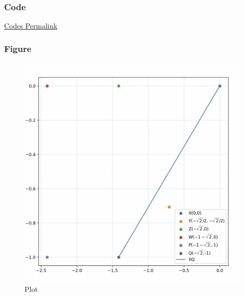 \documentclass{beamer}
\begin{document}
\begin{frame}[fragile]
    \frametitle{Code}
\href{https://github.com/AdityaAppana/ee1030-2025/tree/96431e23cc4d088e70368e400c3c60fbecfcaaa8/ee25btech11004/matgeo/12.18/Codes}{Codes Permalink}
\end{frame}

\begin{frame}[fragile]
    \frametitle{Figure}
\begin{figure}[H]
    \centering
    \includegraphics[width=0.6\columnwidth]{Figs/1218.png}
    \caption{Plot}
    \label{fig:placeholder}
\end{figure}
\end{frame}
\end{document}
